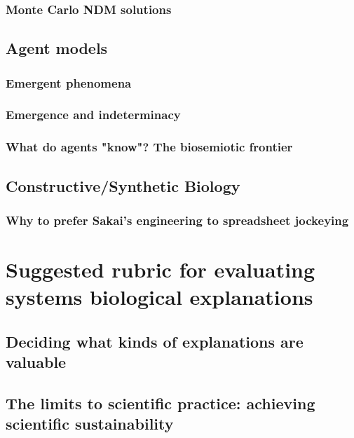 \subsubsection{Monte Carlo NDM solutions}
\subsection{Agent models}
\subsubsection{Emergent phenomena}
\subsubsection{Emergence and indeterminacy}
\subsubsection{What do agents "know"? The biosemiotic frontier}
\subsection{Constructive/Synthetic Biology}
\subsubsection{Why to prefer Sakai's engineering to spreadsheet jockeying}

\section{Suggested rubric for evaluating systems biological explanations}
\subsection{Deciding what kinds of explanations are valuable}
\subsection{The limits to scientific practice: achieving scientific sustainability}